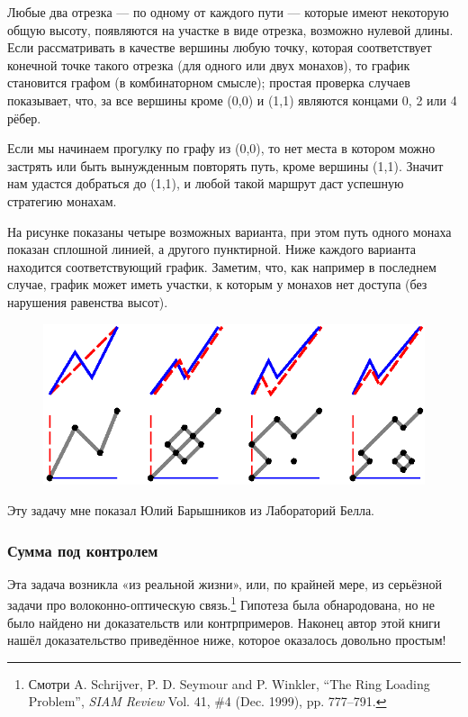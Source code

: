 Любые два отрезка --- по одному от каждого пути --- которые имеют некоторую общую высоту, появляются на участке в виде отрезка, возможно нулевой длины.
Если рассматривать в качестве вершины любую точку, которая соответствует конечной точке такого отрезка (для одного или двух монахов), то график становится графом (в комбинаторном смысле);
простая проверка случаев показывает, что, за все вершины кроме (0,0) и (1,1) являются концами 0, 2 или 4 рёбер.

Если мы начинаем прогулку по графу из (0,0), то нет места в котором можно застрять или быть вынужденным повторять путь, кроме вершины (1,1).
Значит нам удастся добраться до (1,1), и любой такой маршрут даст успешную стратегию монахам.
\heart

На рисунке показаны четыре возможных варианта, при этом путь одного монаха показан сплошной линией, а другого пунктирной.
Ниже каждого варианта находится соответствующий график.
Заметим, что, как например в последнем случае, график может иметь участки, к которым у монахов нет доступа (без нарушения равенства высот).

\begin{figure}[h!]
\centering
\includegraphics[scale=0.9]{Figs/Toughies/monks}
\end{figure} 

Эту задачу мне показал Юлий Барышников из Лабораторий Белла.

\subsubsection*{Сумма под контролем}

Эта задача возникла «из реальной жизни», или, по крайней мере, из серьёзной задачи про волоконно-оптическую связь.\footnote{Смотри A. Schrijver, P. D. Seymour and P. Winkler, ``The Ring Loading Problem'', \emph{SIAM Review} Vol. 41, \#4 (Dec. 1999), pp. 777--791.}
Гипотеза была обнародована, но не было найдено ни доказательств или контрпримеров.
Наконец автор этой книги нашёл доказательство приведённое ниже, которое оказалось довольно простым!

